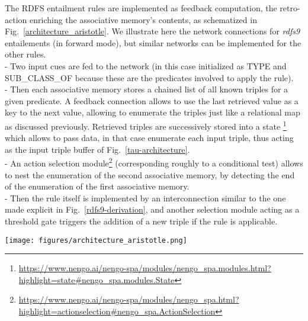 \documentclass[sn-mathphys]{sn-jnl}
\begin{document}
The RDFS entailment rules are implemented as feedback computation, the retro-action enriching the associative memory's contents, as schematized in Fig.~\ref{architecture_aristotle}. We illustrate here the network connections for \textit{rdfs9} entailements (in forward mode), but similar networks can be implemented for the other rules. 
\\- Two input cues are fed to the network (in this case initialized as TYPE and SUB\_CLASS\_OF because these are the predicates involved to apply the rule). 
\\- Then each associative memory stores a chained list of all known triples for a given predicate. A feedback connection allows to use the last retrieved value as a key to the next value, allowing to enumerate the triples just like a relational map as discussed previously. Retrieved triples are successively stored into a state \footnote{\url{https://www.nengo.ai/nengo-spa/modules/nengo_spa.modules.html?highlight=state\#nengo_spa.modules.State}} which allows to pass data, in that case enumerate each input triple, thus acting as the input triple buffer of Fig.~\ref{tau-architecture}.
\\ - An action selection module\footnote{\url{https://www.nengo.ai/nengo-spa/modules/nengo_spa.html?highlight=actionselection\#nengo_spa.ActionSelection}} (corresponding roughly to a conditional test) allows to nest the enumeration of the second associative memory, by detecting the end of the enumeration of the first associative memory.
\\ - Then the rule itself is implemented by an interconnection similar to the one made explicit in Fig.~\ref{rdfs9-derivation}, and another selection module acting as a threshold gate triggers the addition of a new triple if the rule is applicable.


\begin{sidewaysfigure}[htbp]
\centerline{\texttt{[image: figures/architecture\_aristotle.png]}}
\caption{The Nengo architecture for the class inheritance \textit{rdfs9} forward inference rules, see text for details. Associative memories storing the relationships are represented in purple rectangles (one for each predicate of interest). We did not represent here the action selection module that triggers the enumeration of the second associative memory, but the one triggering the application of the rule is accounted for by the similarity test explicitized in the red diamond box. The rule itself requires to unbind the subject and object from the retrieved triple; this is done by unbinding with the superposition of all semantic pointers from the vocabulary (thanks to the distributivity of the VTB algebra), allowing to retrieve an isolated vector regardless of what it was bound to. Finally, simply binding the subject $s_j$ to the object $o_i$ allows to infer a new member ship (if the gating condition applies), as shown by the blue connections.}
\label{architecture_aristotle}
\end{sidewaysfigure}
\end{document}
